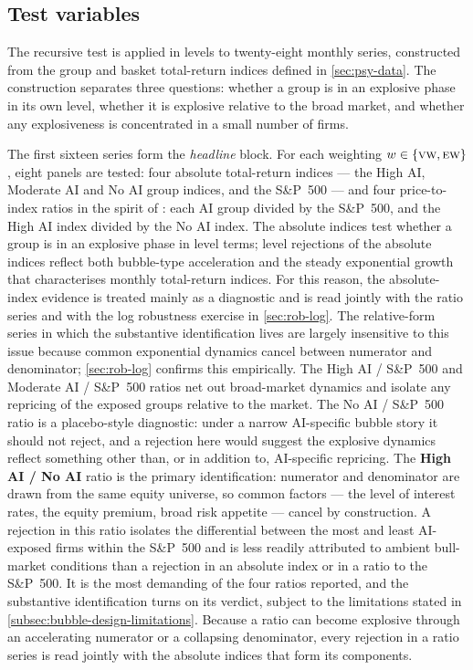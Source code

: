  
\subsection{Test variables}
\label{subsec:bubble-test-variables}
 
The recursive test is applied in levels to twenty-eight monthly series,
constructed from the group and basket total-return indices defined in
\cref{sec:psy-data}. The construction separates three questions:
whether a group is in an explosive phase in its own level, whether it
is explosive relative to the broad market, and whether any
explosiveness is concentrated in a small number of firms.
 
The first sixteen series form the \emph{headline} block. For each
weighting $w \in \{\textsc{vw}, \textsc{ew}\}$, eight panels are tested:
four absolute total-return indices --- the High AI, Moderate AI and No
AI group indices, and the S\&P~500 --- and four price-to-index ratios
in the spirit of \citet{baselePhillipsShi2025}: each AI group divided
by the S\&P~500, and the High AI index divided by the No AI index. The
absolute indices test whether a group is in an explosive phase in level
terms; level rejections of the absolute indices reflect
both bubble-type acceleration and the steady exponential growth
that characterises monthly total-return indices. For this reason, the
absolute-index evidence is treated mainly as a diagnostic and is read
jointly with the ratio series and with the log robustness exercise in
\cref{sec:rob-log}. The relative-form series in which the substantive
identification lives are largely insensitive to this issue because
common exponential dynamics cancel between numerator and denominator;
\cref{sec:rob-log} confirms this empirically. The High AI /
S\&P~500 and Moderate AI / S\&P~500 ratios net out broad-market
dynamics and isolate any repricing of the exposed groups relative to
the market. The No AI / S\&P~500 ratio is a placebo-style diagnostic:
under a narrow AI-specific bubble story it should not reject, and a
rejection here would suggest the explosive dynamics reflect something
other than, or in addition to, AI-specific repricing. The \textbf{High AI / No AI} ratio is the
primary identification: numerator and denominator are drawn from the
same equity universe, so common factors --- the level of interest
rates, the equity premium, broad risk appetite --- cancel by
construction. A rejection in this ratio isolates the differential
between the most and least AI-exposed firms within the S\&P~500 and is
less readily attributed to ambient bull-market conditions than a
rejection in an absolute index or in a ratio to the S\&P~500. It is the
most demanding of the four ratios reported, and the substantive
identification turns on its verdict, subject to the limitations stated
in \cref{subsec:bubble-design-limitations}. Because a ratio can become
explosive through an accelerating numerator or a collapsing
denominator, every rejection in a ratio series is read jointly with
the absolute indices that form its components.
 
